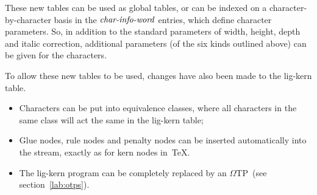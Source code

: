 \documentclass[fleqn]{article}
\newcommand{\OMEGA}{$\Omega$}
\newcommand{\OTP}{\OMEGA TP}
\newcommand{\myit}[1]{\mbox{\emph{#1}}}
\begin{document}
These new tables can be used as global tables, or can be indexed
on a character-by-character basis in the $\myit{char-info-word}$ entries,
which define character parameters.  So, in addition to the standard
parameters of width, height, depth and italic correction, additional
parameters (of the six kinds outlined above) can be given for the
characters.

To allow these new tables to be used, changes have also been made
to the lig-kern table.
\begin{itemize}
\item Characters can be put into equivalence classes, where all
characters in the same class will act the same in the lig-kern table;
\item Glue nodes, rule nodes and penalty nodes can be inserted
automatically into the stream, exactly as for kern nodes in~\TeX.
\item The lig-kern program can be completely replaced by an \OTP\ (see
section~\ref{lab:otps}).
\end{itemize}
\end{document}

